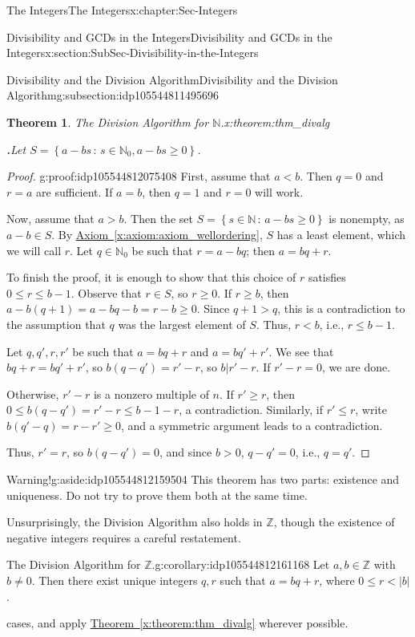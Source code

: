 \documentclass[oneside,10pt,]{book}
\newcommand{\blocktitlefont}{\relax}
\newcommand{\xreffont}{\relax}
\numberwithin{equation}{section}
\renewcommand{\le}{\leqslant}
\renewcommand{\ge}{\geqslant}
\newcommand{\setof}[2]{{\left\{#1\,\colon\,#2\right\}}}
\def\Z{{\mathbb Z}}
\def\N{{\mathbb N}}
\newtheorem{theorem}{Theorem}[section]
\newcommand{\lt}{<}
\begin{document}
\begin{chapterptx}{The Integers}{}{The Integers}{}{}{x:chapter:Sec-Integers}
\begin{sectionptx}{Divisibility and GCDs in the Integers}{}{Divisibility and GCDs in the Integers}{}{}{x:section:SubSec-Divisibility-in-the-Integers}
\begin{subsectionptx}{Divisibility and the Division Algorithm}{}{Divisibility and the Division Algorithm}{}{}{g:subsection:idp105544811495696}
\begin{theorem}{The Division Algorithm for \(\N\).}{}{x:theorem:thm_divalg}
\par\smallskip%
\noindent\textbf{\blocktitlefont 2.}\quad{}Let \(S = \setof{a-bs}{s\in \N_0, a-bs\ge 0}\).%
\end{theorem}
\begin{proof}{}{g:proof:idp105544812075408}
First, assume that \(a \lt b\). Then \(q = 0\) and \(r = a\) are sufficient. If \(a = b\), then \(q = 1\) and \(r = 0\) will work.%
\par
Now, assume that \(a > b\). Then the set \(S = \setof{s\in\N}{a-bs \ge 0}\) is nonempty, as \(a-b\in S\). By \hyperref[x:axiom:axiom_wellordering]{Axiom~{\xreffont\ref{x:axiom:axiom_wellordering}}}, \(S\) has a least element, which we will call \(r\). Let \(q\in \N_0\) be such that \(r = a-bq\); then \(a = bq + r\).%
\par
To finish the proof, it is enough to show that this choice of \(r\) satisfies \(0\le r \le b-1\). Observe that \(r\in S\), so \(r\ge 0\). If \(r \ge b\), then \(a - b(q+1) = a-bq -b = r -b \ge 0\). Since \(q+1 > q\), this is a contradiction to the assumption that \(q\) was the largest element of \(S\). Thus, \(r \lt b\), i.e., \(r \le b-1\).%
\par
Let \(q,q',r,r'\) be such that \(a = bq+r\) and \(a=bq'+r'\). We see that \(bq+r = bq' + r'\), so \(b(q-q') = r'-r\), so \(b|r'-r\). If \(r'-r = 0\), we are done.%
\par
Otherwise, \(r'-r\) is a nonzero multiple of \(n\). If \(r' \ge r\), then \(0\le b(q-q') = r' - r \le b-1 - r\), a contradiction. Similarly, if \(r' \le r\), write \(b(q'-q) = r-r' \ge 0\), and a symmetric argument leads to a contradiction.%
\par
Thus, \(r' = r\), so \(b(q-q') = 0\), and since \(b > 0\), \(q - q'= 0\), i.e., \(q = q'\).%
\end{proof}
\begin{aside}{Warning!}{g:aside:idp105544812159504}%
This theorem has two parts: existence and uniqueness. Do not try to prove them both at the same time.%
\end{aside}
Unsurprisingly, the Division Algorithm also holds in \(\Z\), though the existence of negative integers requires a careful restatement. %
\begin{corollary}{The Division Algorithm for \(\Z\).}{}{g:corollary:idp105544812161168}%
\index{Division Algorithm (\(\Z\))}%
Let \(a,b\in \Z\) with \(b\ne 0\). Then there exist unique integers \(q,r\) such that \(a = bq + r\), where \(0 \le r \lt |b|\).%
\par\smallskip%
\noindentConsider cases, and apply \hyperref[x:theorem:thm_divalg]{Theorem~{\xreffont\ref{x:theorem:thm_divalg}}} wherever possible.%

\end{corollary}
\end{subsectionptx}
\end{sectionptx}
\end{chapterptx}
\end{document}
